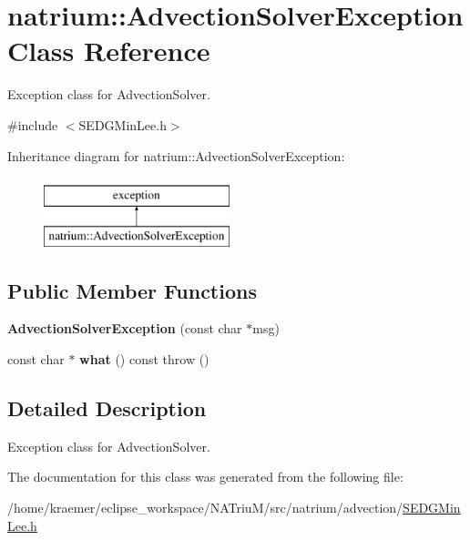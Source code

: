 \hypertarget{classnatrium_1_1AdvectionSolverException}{\section{natrium\-:\-:Advection\-Solver\-Exception Class Reference}
\label{classnatrium_1_1AdvectionSolverException}
}


Exception class for Advection\-Solver.  




{\ttfamily \#include $<$S\-E\-D\-G\-Min\-Lee.\-h$>$}

Inheritance diagram for natrium\-:\-:Advection\-Solver\-Exception\-:\begin{figure}[H]
\begin{center}
\leavevmode
\includegraphics[height=2.000000cm]{classnatrium_1_1AdvectionSolverException}
\end{center}
\end{figure}
\subsection*{Public Member Functions}
\begin{DoxyCompactItemize}
\item 
\hypertarget{classnatrium_1_1AdvectionSolverException_a443084a12dee879bdfbfc900202a0706}{{\bfseries Advection\-Solver\-Exception} (const char $\ast$msg)}\label{classnatrium_1_1AdvectionSolverException_a443084a12dee879bdfbfc900202a0706}

\item 
\hypertarget{classnatrium_1_1AdvectionSolverException_aeb13fafe3f75de7cfd4e282a8a0fb5b0}{const char $\ast$ {\bfseries what} () const   throw ()}\label{classnatrium_1_1AdvectionSolverException_aeb13fafe3f75de7cfd4e282a8a0fb5b0}

\end{DoxyCompactItemize}


\subsection{Detailed Description}
Exception class for Advection\-Solver. 

The documentation for this class was generated from the following file\-:\begin{DoxyCompactItemize}
\item 
/home/kraemer/eclipse\-\_\-workspace/\-N\-A\-Triu\-M/src/natrium/advection/\hyperlink{SEDGMinLee_8h}{S\-E\-D\-G\-Min\-Lee.\-h}\end{DoxyCompactItemize}
